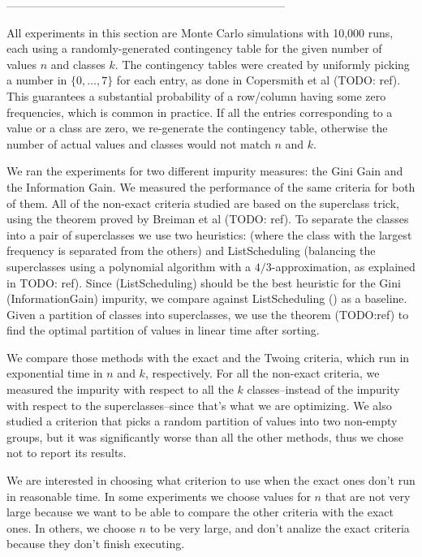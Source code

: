  

--------------------------------------------------------------------------


All experiments in this section are Monte Carlo simulations with 10,000 runs, each using a randomly-generated contingency table for the given number of values $n$ and classes $k$. The contingency tables were created by uniformly picking a number in $\{0, \ldots, 7\}$ for each entry, as done in Copersmith et al (TODO: ref). This guarantees a substantial probability of a row/column having some zero frequencies, which is common in practice. If all the entries corresponding to a value or a class are zero, we re-generate the contingency table, otherwise the number of actual values and classes would not match $n$ and $k$.

We ran the experiments for two different impurity measures: the Gini Gain and the Information Gain. We measured the performance of the same criteria for both of them. All of the non-exact criteria studied are based on the superclass trick, using the theorem proved by Breiman et al (TODO: ref). To separate the classes into a pair of superclasses we use two heuristics: \Alg (where the class with the largest frequency is separated from the others) and ListScheduling (balancing the superclasses using a polynomial algorithm with a $4/3$-approximation, as explained in TODO: ref). Since \Alg (ListScheduling) should be the best heuristic for the Gini (InformationGain) impurity, we compare against ListScheduling (\Alg) as a baseline. Given a partition of classes into superclasses, we use the theorem (TODO:ref) to find the optimal partition of values in linear time after sorting.

We compare those methods with the exact and the Twoing criteria, which run in exponential time in $n$ and $k$, respectively. For all the non-exact criteria, we measured the impurity with respect to all the $k$ classes--instead of the impurity with respect to the superclasses--since that's what we are optimizing. We also studied a criterion that picks a random partition of values into two non-empty groups, but it was significantly worse than all the other methods, thus we chose not to report its results. 

We are interested in choosing what criterion to use when the exact ones don't run in reasonable time. In some experiments we choose values for $n$ that are not very large because we want to be able to compare the other criteria with the exact ones. In others, we choose $n$ to be very large, and don't analize the exact criteria because they don't finish executing.



